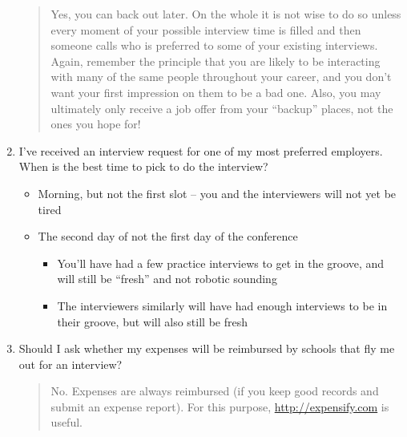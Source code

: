\documentclass{\classes/econtex}
\providecommand\phantomsection{}
\begin{document}
\begin{enumerate}
  \begin{quote}
    Yes, you can back out later.  On the whole it is not wise to do so unless every moment of your possible interview time is filled and then someone calls who is preferred to some of your existing interviews.  Again, remember the principle that you are likely to be interacting with many of the same people throughout your career, and you don't want your first impression on them to be a bad one.  Also, you may ultimately only receive a job offer from your ``backup'' places, not the ones you hope for!

  \end{quote}
  \ifdvi\phantomsection\hypertarget{InterviewBestTime}{}\fi
  
\item  I've received an interview request for one of my most preferred employers. When is the best time to pick to do the interview?
  \begin{itemize}
  \item Morning, but not the first slot -- you and the interviewers will not yet be tired
  \item The second day of not the first day of the conference
    \begin{itemize}
    \item You'll have had a few practice interviews to get in the groove, and will still be ``fresh'' and not robotic sounding
    \item The interviewers similarly will have had enough interviews to be in their groove, but will also still be fresh
    \end{itemize}
  \end{itemize}

\item  Should I ask whether my expenses will be reimbursed by schools that fly me out for an interview?
  \begin{quote}
    No.  Expenses are always reimbursed (if you keep good records and submit an expense report).  For this purpose, \url{http://expensify.com} is useful.

  \end{quote}


\end{enumerate}
\end{document}
